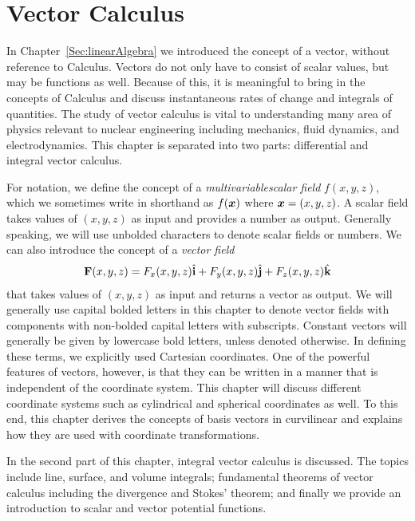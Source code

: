 \chapter{Vector Calculus} \label{Sec:vector}

In Chapter~\ref{Sec:linearAlgebra} we introduced the concept of a vector, without reference to Calculus. Vectors do not only have to consist of scalar values, but may be functions as well. Because of this, it is meaningful to bring in the concepts of Calculus and discuss instantaneous rates of change and integrals of quantities. The study of vector calculus is vital to understanding many area of physics relevant to nuclear engineering including mechanics, fluid dynamics, and electrodynamics. This chapter is separated into two parts: differential and integral vector calculus.

For notation, we define the concept of a \emph{multivariablescalar field} $f(x,y,z)$, which we sometimes write in shorthand as $f(\bm{x})$ where $\bm{x} = (x,y,z)$. A scalar field takes values of $(x,y,z)$ as input and provides a number as output. Generally speaking, we will use unbolded characters to denote scalar fields or numbers. We can also introduce the concept of a \emph{vector field}
\begin{align}
  \mathbf{F}(x,y,z) = F_x(x,y,z) \hat{\mathbf{i}} + F_y(x,y,z) \hat{\mathbf{j}} + F_z(x,y,z) \hat{\mathbf{k}}
\end{align}
that takes values of $(x,y,z)$ as input and returns a vector as output. We will generally use capital bolded letters in this chapter to denote vector fields with components with non-bolded capital letters with subscripts. Constant vectors will generally be given by lowercase bold letters, unless denoted otherwise. In defining these terms, we explicitly used Cartesian coordinates. One of the powerful features of vectors, however, is that they can be written in a manner that is independent of the coordinate system. This chapter will discuss different coordinate systems such as cylindrical and spherical coordinates as well. To this end, this chapter derives the concepts of basis vectors in curvilinear and explains how they are used with coordinate transformations.

In the second part of this chapter, integral vector calculus is discussed. The topics include line, surface, and volume integrals; fundamental theorems of vector calculus including the divergence and Stokes' theorem; and finally we provide an introduction to scalar and vector potential functions.

